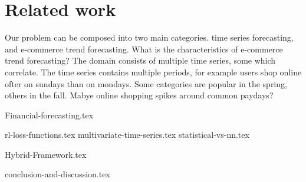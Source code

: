 
\chapter{Related work}\label{RelatedWorkMain}
Our problem can be composed into two main categories.
time series forecasting, and e-commerce trend forecasting.
What is the characteristics of e-commerce trend forecasting?
The domain consists of multiple time series, some which correlate.
The time series contains multiple periods, for example users shop
online ofter on sundays than on mondays. 
Some categories are popular in the spring, others in the fall.
Mabye online shopping spikes around common paydays?



{Financial-forecasting.tex}

{rl-loss-functions.tex}
{multivariate-time-series.tex}
{statistical-vs-nn.tex}

{Hybrid-Framework.tex}

{conclusion-and-discussion.tex}